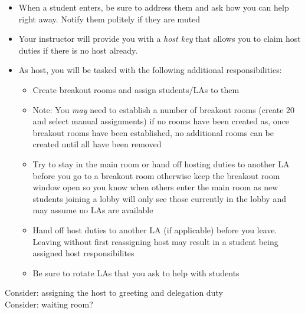 \documentclass[12pt]{scrartcl}
\begin{document}
\begin{itemize}
  \item When a student enters, be sure to address them and ask how you can help right away.  Notify them politely if they are muted
  \item Your instructor will provide you with a \emph{host key} that allows you to claim host duties if there is no host already.
  \item As host, you will be tasked with the following additional responsibilities:
  \begin{itemize}
    \item Create breakout rooms and assign students/LAs to them
    \item Note: You \emph{may} need to establish a number of breakout rooms (create 20 and select manual assignments) if no rooms have been created as, once breakout rooms have been established, no additional rooms can be created until all have been removed
    \item Try to stay in the main room or hand off hosting duties to another LA before you go to a breakout room otherwise keep the breakout room window open so you know when others enter the main room as new students joining a lobby will only see those currently in the lobby and may assume no LAs are available
    \item Hand off host duties to another LA (if applicable) before you leave. Leaving without first reassigning host may result in a student being assigned host responsibilites
    \item Be sure to rotate LAs that you ask to help with students
  \end{itemize}
\end{itemize}

Consider: assigning the host to greeting and delegation duty \\
Consider: waiting room?
\end{document}
